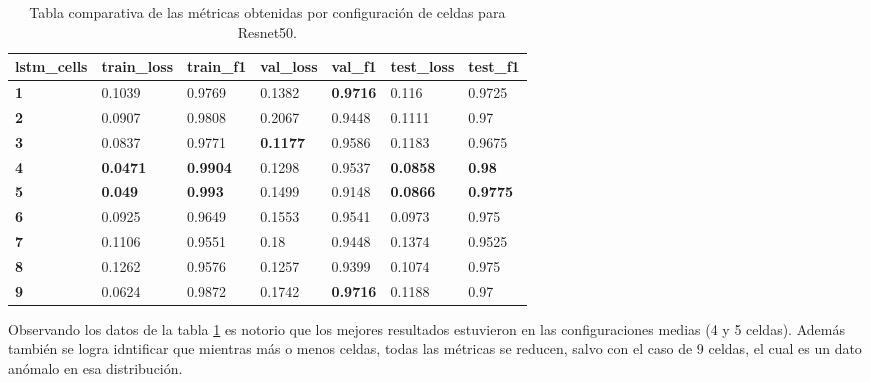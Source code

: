 \begin{table}[h!]
\centering
\begin{tabular}{|l|l|l|l|l|l|l|}
\hline
\textbf{lstm\_cells} & \textbf{train\_loss} & \textbf{train\_f1} & \textbf{val\_loss} & \textbf{val\_f1} & \textbf{test\_loss} & \textbf{test\_f1} \\ \hline
\textbf{1}           & 0.1039               & 0.9769             & 0.1382             & \textbf{0.9716}  & 0.116               & 0.9725            \\ \hline
\textbf{2}           & 0.0907               & 0.9808             & 0.2067             & 0.9448           & 0.1111              & 0.97              \\ \hline
\textbf{3}           & 0.0837               & 0.9771             & \textbf{0.1177}    & 0.9586           & 0.1183              & 0.9675            \\ \hline
\textbf{4}           & \textbf{0.0471}      & \textbf{0.9904}    & 0.1298             & 0.9537           & \textbf{0.0858}     & \textbf{0.98}     \\ \hline
\textbf{5}           & \textbf{0.049}       & \textbf{0.993}     & 0.1499             & 0.9148           & \textbf{0.0866}     & \textbf{0.9775}   \\ \hline
\textbf{6}           & 0.0925               & 0.9649             & 0.1553             & 0.9541           & 0.0973              & 0.975             \\ \hline
\textbf{7}           & 0.1106               & 0.9551             & 0.18               & 0.9448           & 0.1374              & 0.9525            \\ \hline
\textbf{8}           & 0.1262               & 0.9576             & 0.1257             & 0.9399           & 0.1074              & 0.975             \\ \hline
\textbf{9}           & 0.0624               & 0.9872             & 0.1742             & \textbf{0.9716}  & 0.1188              & 0.97              \\ \hline
\end{tabular}
\caption{ Tabla comparativa de las métricas obtenidas por configuración de celdas para Resnet50.}
\label{table:Resnet50}
\end{table}

Observando los datos de la tabla \ref{table:Resnet50} es 
notorio que los mejores resultados estuvieron en las 
configuraciones medias (4 y 5 celdas). Además también se 
logra idntificar que mientras más o menos celdas, todas las 
métricas se reducen, salvo con el caso de 9 celdas, el cual 
es un dato anómalo en esa distribución. 

